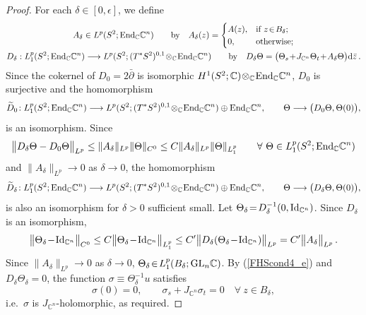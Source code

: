 \documentclass[11pt]{article}
\numberwithin{equation}{section}
\theoremstyle{definition}
\def\eref#1{(\ref{#1})}
\def\ti#1{\widetilde{#1}}
\def\lra{\longrightarrow}
\def\C{\mathbb{C}}
\def\de{\delta}
\def\ep{\epsilon}
\def\si{\sigma}
\def\Th{\Theta}
\def\dbar{\bar\partial}
\def\End{\textnormal{End}}
\def\GL{\textnormal{GL}}
\def\Id{\textnormal{Id}}
\def\nd{\textnormal{d}}
\begin{document}
\begin{proof}
For each $\de\!\in\![0,\ep]$, we define 
\begin{gather*}
A_{\de}\in L^p(S^2;\End_{\C}\C^n)
\qquad\hbox{by}\quad
A_{\de}(z)=\begin{cases}A(z),&\hbox{if}~z\!\in\!B_{\de};\\
0,&\hbox{otherwise};\end{cases}\\
D_{\de}: L_1^p(S^2;\End_{\C}\C^n)\lra L^p(S^2;(T^*S^2)^{0,1}\!\otimes_{\C}\!\End_{\C}\C^n)
\qquad\hbox{by}\quad
D_{\de}\Th=\big(\Th_s\!+\!J_{\C^n}\Th_t\!+\!A_{\de}\Th\big)\nd\bar{z}\,.
\end{gather*}
Since the cokernel of $D_0\!=\!2\dbar$ is isomorphic $H^1(S^2;\C)\!\otimes_{\C}\!\End_{\C}\C^n$,
$D_0$ is surjective and the homomorphism 
$$\ti{D}_0\!:L_1^p(S^2;\End_{\C}\C^n)\lra L^p(S^2;(T^*S^2)^{0,1}\!\otimes_{\C}\!\End_{\C}\C^n)
\oplus \End_{\C}\C^n,
\qquad \Th\lra \big(D_0\Th,\Th(0)\big),$$
is an isomorphism. 
Since 
$$\big\|D_{\de}\Th-D_0\Th\big\|_{L^p} \le \|A_{\de}\|_{L^p}\|\Th\|_{C^0}
\le C\|A_{\de}\|_{L^p}\|\Th\|_{L^p_1}
\qquad\forall~\Th\in L_1^p(S^2;\End_{\C}\C^n)$$
and $\|A_{\de}\|_{L^p}\!\lra\!0$ as $\de\!\lra\!0$, the homomorphism 
$$\ti{D}_{\de}\!:L_1^p(S^2;\End_{\C}\C^n)\lra 
L^p(S^2;(T^*S^2)^{0,1}\!\otimes_{\C}\!\End_{\C}\C^n)\oplus \End_{\C}\C^n,
\qquad \Th\lra \big(D_{\de}\Th,\Th(0)\big),$$
is also an isomorphism for $\de\!>\!0$ sufficient small.
Let $\Th_{\de}\!=\!D_{\de}^{-1}(0,\Id_{\C^n})$.
Since $D_{\de}$ is an isomorphism,
$$\big\|\Th_{\de}\!-\!\Id_{\C^n}\big\|_{C^0}
\le C \big\|\Th_{\de}\!-\!\Id_{\C^n}\big\|_{L^p_1}
\le C'\big\|D_{\de}(\Th_{\de}\!-\!\Id_{\C^n})\big\|_{L^p}
= C'\big\|A_{\de}\big\|_{L^p}\,.$$
Since $\|A_{\de}\|_{L^p}\!\lra\!0$ as $\de\!\lra\!0$, 
$\Th_{\de}\!\in\!L_1^p(B_{\de};\GL_n\C)$.
By \eref{FHScond4_e} and $D_{\de}\Th_{\de}\!=\!0$, 
the function \hbox{$\si\!\equiv\!\Th_{\de}^{-1}u$} satisfies
$$\si(0)=0,\qquad \si_s\!+\!J_{\C^n}\si_t\!=\!0\quad\forall~z\in B_{\de},$$ 
i.e.~$\si$ is $J_{\C^n}$-holomorphic, as required.
\end{proof}
\end{document}
